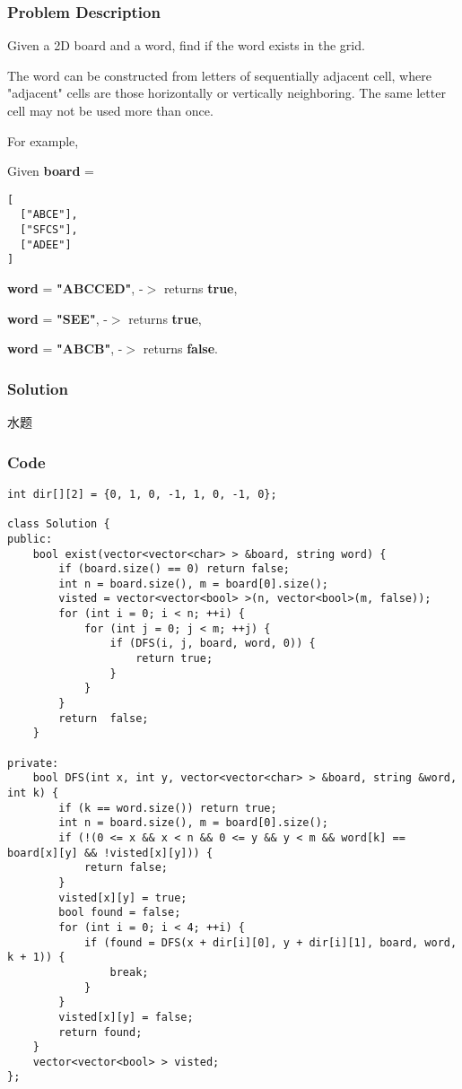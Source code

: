\documentclass[courier]{article}
\begin{document}
\begin{CJK*}{UTF8}{gkai}
\subsubsection*{Problem Description}
Given a 2D board and a word, find if the word exists in the grid.

The word can be constructed from letters of sequentially adjacent cell, where "adjacent" cells are those horizontally or vertically neighboring. The same letter cell may not be used more than once.

For example,


Given \textbf{board} = 
\begin{verbatim}
[
  ["ABCE"],
  ["SFCS"],
  ["ADEE"]
]
\end{verbatim}

\textbf{word} = \textbf{"ABCCED"}, -$>$ returns \textbf{true},


\textbf{word} = \textbf{"SEE"}, -$>$ returns \textbf{true},


\textbf{word} = \textbf{"ABCB"}, -$>$ returns \textbf{false}.



\subsubsection*{Solution}
水题

\subsubsection*{Code}
\begin{lstlisting}
int dir[][2] = {0, 1, 0, -1, 1, 0, -1, 0};

class Solution {
public:
    bool exist(vector<vector<char> > &board, string word) {
        if (board.size() == 0) return false;
        int n = board.size(), m = board[0].size();
        visted = vector<vector<bool> >(n, vector<bool>(m, false));
        for (int i = 0; i < n; ++i) {
            for (int j = 0; j < m; ++j) {
                if (DFS(i, j, board, word, 0)) {
                    return true;
                }
            }
        }
        return  false;
    }
    
private:
    bool DFS(int x, int y, vector<vector<char> > &board, string &word, int k) {
        if (k == word.size()) return true;
        int n = board.size(), m = board[0].size();
        if (!(0 <= x && x < n && 0 <= y && y < m && word[k] == board[x][y] && !visted[x][y])) {
            return false;
        }
        visted[x][y] = true;
        bool found = false;
        for (int i = 0; i < 4; ++i) {
            if (found = DFS(x + dir[i][0], y + dir[i][1], board, word, k + 1)) {
                break;
            }
        }
        visted[x][y] = false;
        return found;
    }
    vector<vector<bool> > visted;
}; 
\end{lstlisting}



\end{CJK*}
\end{document}
